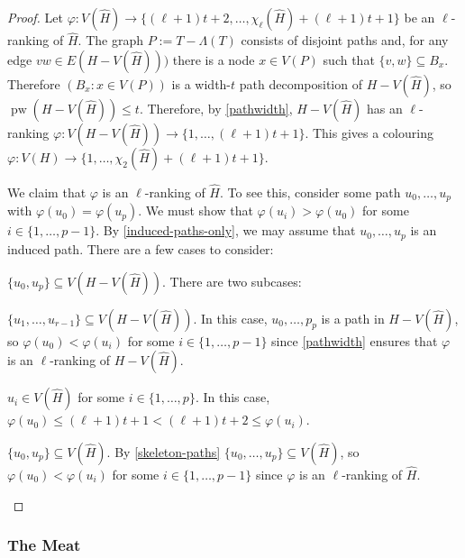\documentclass[kpfonts]{patmorin}
\DeclareMathOperator{\pw}{pw}
\newcommand{\trn}{\chi_2}
\newcommand{\lrn}{\chi_{\ell}}
\theoremstyle{named}
\begin{document}
\begin{proof}
    Let $\varphi:V(\hat{H})\to \{(\ell+1)t+2,\ldots,\lrn(\hat{H})+(\ell+1)t+1\}$ be an $\ell$-ranking of $\hat{H}$. The graph $P:=T-\Lambda(T)$ consists of disjoint paths and, for any edge $vw\in E(H-V(\hat{H})))$ there is a node $x\in V(P)$ such that $\{v,w\}\subseteq B_x$.  Therefore $(B_x:x\in V(P))$ is a width-$t$ path decomposition of $H-V(\hat{H})$, so $\pw(H-V(\hat{H}))\le t$.  Therefore, by \cref{pathwidth}, $H-V(\hat{H})$ has an $\ell$-ranking $\varphi:V(H-V(\hat{H}))\to\{1,\ldots,(\ell+1)t+1\}$.  This gives a colouring $\varphi: V(H)\to\{1,\ldots,\trn(\hat{H})+(\ell+1)t+1\}$.

    We claim that $\varphi$ is an $\ell$-ranking of $\hat{H}$.  To see this, consider some path $u_0,\ldots,u_p$ with $\varphi(u_0)=\varphi(u_p)$.  We must show that $\varphi(u_i)>\varphi(u_0)$ for some $i\in\{1,\ldots,p-1\}$.
    By \cref{induced-paths-only}, we may assume that $u_0,\ldots,u_p$ is an induced path. There are a few cases to consider:
    \begin{compactenum}
        \item $\{u_0,u_p\}\subseteq V(H-V(\hat{H}))$. There are two subcases:
        \begin{compactenum}
            \item $\{u_1,\ldots,u_{r-1}\}\subseteq V(H-V(\hat{H}))$.  In this case, $u_0,\ldots,p_p$ is a path in $H-V(\hat{H})$, so  $\varphi(u_0)<\varphi(u_i)$ for some $i\in\{1,\ldots,p-1\}$ since \cref{pathwidth} ensures that $\varphi$ is an $\ell$-ranking of $H-V(\hat{H})$.

            \item $u_i\in V(\hat{H})$ for some $i\in\{1,\ldots,p\}$. In this case, $\varphi(u_0)\le (\ell+1)t+1 < (\ell+1)t+2 \le \varphi(u_i)$.
        \end{compactenum}
        \item $\{u_0,u_p\}\subseteq V(\hat{H})$.
        By \cref{skeleton-paths}  $\{u_0,\ldots,u_p\}\subseteq V(\hat{H})$, so  $\varphi(u_0)<\varphi(u_i)$ for some $i\in\{1,\ldots,p-1\}$ since $\varphi$ is an $\ell$-ranking of $\hat{H}$. \qedhere
    \end{compactenum}
\end{proof}

\subsubsection{The Meat}
\end{document}
